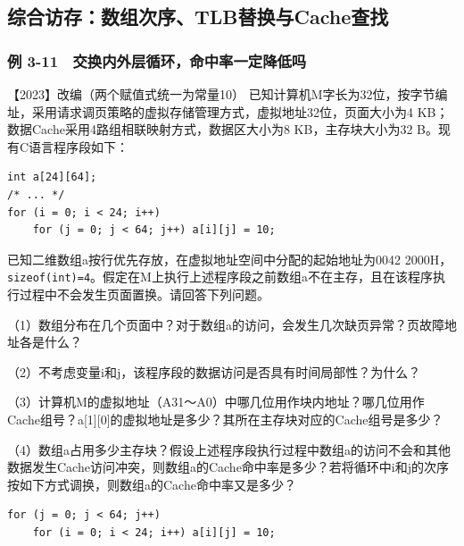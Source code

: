 \subsection{综合访存：数组次序、TLB替换与Cache查找}\label{co-memory-synthesis}

\subsubsection{例 3-11　交换内外层循环，命中率一定降低吗}\label{co-ex3-11}

\noindent{}【2023】改编（两个赋值式统一为常量10） 已知计算机M字长为32位，按字节编址，采用请求调页策略的虚拟存储管理方式，虚拟地址32位，页面大小为4 KB；数据Cache采用4路组相联映射方式，数据区大小为8 KB，主存块大小为32 B。现有C语言程序段如下：

\par\medskip\noindent
\begin{minipage}{\linewidth}
\begin{verbatim}
int a[24][64];
/* ... */
for (i = 0; i < 24; i++)
    for (j = 0; j < 64; j++) a[i][j] = 10;
\end{verbatim}
\end{minipage}\par\medskip

已知二维数组a按行优先存放，在虚拟地址空间中分配的起始地址为0042 2000H，\texttt{sizeof(int)=4}。假定在M上执行上述程序段之前数组a不在主存，且在该程序执行过程中不会发生页面置换。请回答下列问题。

（1）数组分布在几个页面中？对于数组a的访问，会发生几次缺页异常？页故障地址各是什么？

（2）不考虑变量i和j，该程序段的数据访问是否具有时间局部性？为什么？

（3）计算机M的虚拟地址（A31～A0）中哪几位用作块内地址？哪几位用作Cache组号？a{[}1{]}{[}0{]}的虚拟地址是多少？其所在主存块对应的Cache组号是多少？

（4）数组a占用多少主存块？假设上述程序段执行过程中数组a的访问不会和其他数据发生Cache访问冲突，则数组a的Cache命中率是多少？若将循环中i和j的次序按如下方式调换，则数组a的Cache命中率又是多少？

\par\medskip\noindent
\begin{minipage}{\linewidth}
\begin{verbatim}
for (j = 0; j < 64; j++)
    for (i = 0; i < 24; i++) a[i][j] = 10;
\end{verbatim}
\end{minipage}\par\medskip

